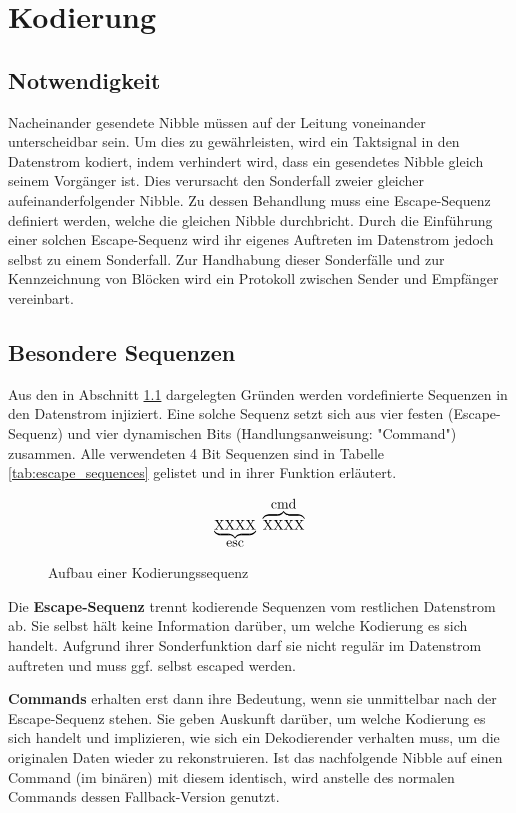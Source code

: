 \chapter{Kodierung}
\section{Notwendigkeit}
\label{sec:notwendigkeit}
Nacheinander gesendete Nibble müssen auf der Leitung voneinander unterscheidbar sein. Um dies zu gewährleisten, wird ein Taktsignal in den Datenstrom kodiert, indem verhindert wird, dass ein gesendetes Nibble gleich seinem Vorgänger ist. Dies verursacht den Sonderfall zweier gleicher aufeinanderfolgender Nibble. Zu dessen Behandlung muss eine Escape-Sequenz definiert werden, welche die gleichen Nibble durchbricht. Durch die Einführung einer solchen Escape-Sequenz wird ihr eigenes Auftreten im Datenstrom jedoch selbst zu einem Sonderfall. Zur Handhabung dieser Sonderfälle und zur Kennzeichnung von Blöcken wird ein Protokoll zwischen Sender und Empfänger vereinbart.

\section{Besondere Sequenzen}
Aus den in Abschnitt \ref{sec:notwendigkeit} dargelegten Gründen werden vordefinierte Sequenzen in den Datenstrom injiziert. Eine solche Sequenz setzt sich aus vier festen (Escape-Sequenz) und vier dynamischen Bits (Handlungsanweisung: "Command") zusammen. Alle verwendeten 4 Bit Sequenzen sind in Tabelle \ref{tab:escape_sequences} gelistet und in ihrer Funktion erläutert.

\begin{figure}[H]
    \centering
    \[
        \underbrace{\text{XXXX}}_\text{\normalsize esc} \ \overbrace{\text{XXXX}}^\text{\normalsize cmd}
    \]
    \caption{Aufbau einer Kodierungssequenz}
\end{figure}

Die \textbf{Escape-Sequenz} trennt kodierende Sequenzen vom restlichen Datenstrom ab. Sie selbst hält keine Information darüber, um welche Kodierung es sich handelt. Aufgrund ihrer Sonderfunktion darf sie nicht regulär im Datenstrom auftreten und muss ggf. selbst escaped werden.

\textbf{Commands} erhalten erst dann ihre Bedeutung, wenn sie unmittelbar nach der Escape-Sequenz stehen. Sie geben Auskunft darüber, um welche Kodierung es sich handelt und implizieren, wie sich ein Dekodierender verhalten muss, um die originalen Daten wieder zu rekonstruieren. Ist das nachfolgende Nibble auf einen Command (im binären) mit diesem identisch, wird anstelle des normalen Commands dessen Fallback-Version genutzt.

